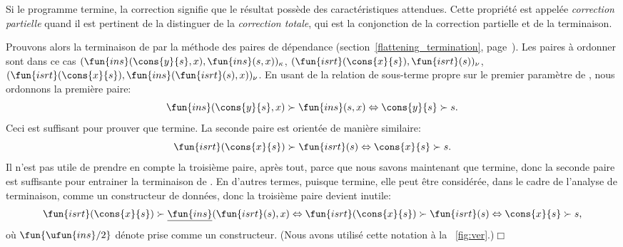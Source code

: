 
Si le programme termine, la correction signifie que le résultat
possède des caractéristiques attendues. Cette propriété est appelée
\emph{correction partielle} quand il est pertinent de la distinguer de
la \emph{correction totale}, qui est la conjonction de la correction
partielle et de la terminaison.

Prouvons alors la terminaison de  par la méthode des
paires de dépendance
(section~\ref{flattening_termination},
page~\pageref{flattening_termination}). Les paires à ordonner sont
dans ce cas \((\fun{ins}(\cons{y}{s},x), \fun{ins}(s,x))_\kappa\),
\((\fun{isrt}(\cons{x}{s}), \fun{isrt}(s))_\nu\),
\((\fun{isrt}(\cons{x}{s}), \fun{ins}(\fun{isrt}(s), x))_\nu\). En
usant de la relation de sous-terme propre sur le premier paramètre de
, nous ordonnons la première paire:
\begin{equation*}
\fun{ins}(\cons{y}{s},x) \succ \fun{ins}(s,x) \Leftrightarrow
\cons{y}{s} \succ s.
\end{equation*}
Ceci est suffisant pour prouver que  termine. La seconde
paire est orientée de manière similaire:
\begin{equation*}
\fun{isrt}(\cons{x}{s}) \succ \fun{isrt}(s) \Leftrightarrow
\cons{x}{s} \succ s.
\end{equation*}
Il n'est pas utile de prendre en compte la troisième paire, après
tout, parce que nous savons maintenant que  termine, donc
la seconde paire est suffisante pour entrainer la terminaison de
. En d'autres termes, puisque
 termine, elle peut être considérée, dans le cadre de
l'analyse de terminaison, comme un constructeur de données, donc la
troisième paire devient inutile:
\begin{equation*}
\fun{isrt}(\cons{x}{s}) \succ \underline{\fun{ins}}(\fun{isrt}(s), x)
\Leftrightarrow \fun{isrt}(\cons{x}{s}) \succ \fun{isrt}(s)
\Leftrightarrow \cons{x}{s} \succ s,
\end{equation*}
où \(\fun{\ufun{ins}/2}\) dénote 
prise comme un constructeur. (Nous avons utilisé cette notation à la
\fig~\vref{fig:ver}.)\hfill\(\Box\)

